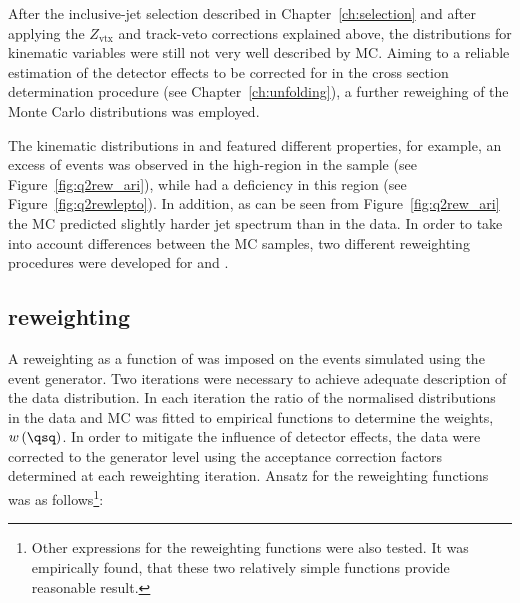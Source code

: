 After the inclusive-jet selection described in Chapter~\ref{ch:selection} and after applying the $Z_\text{vtx}$ and track-veto corrections explained above, the distributions for kinematic variables were still not very well described by MC. Aiming to a reliable estimation of the detector effects to be corrected for in the cross section determination procedure (see Chapter~\ref{ch:unfolding}), a further reweighing of the Monte Carlo distributions was employed. 

The kinematic distributions in \lepto and \ariadne featured different properties, for example, an excess of events was observed in the high-\qsq region in the \ariadne sample (see Figure~\ref{fig:q2rew_ari}), while \lepto had a deficiency in this region (see Figure~\ref{fig:q2rewlepto}). In addition, as can be seen from Figure~\ref{fig:q2rew_ari} the \ariadne MC predicted slightly harder jet spectrum than in the data. In order to take into account differences between the MC samples, two different reweighting procedures were developed for \lepto and \ariadne.

\subsection{\lepto reweighting}
\label{subsec:leptoq2rew}
A reweighting as a function of \qsq was imposed on the events simulated using the \lepto event generator. Two iterations were necessary to achieve adequate description of the data distribution. In each iteration the ratio of the normalised \qsq distributions in the data and MC was fitted to empirical functions to determine the weights, $w\left( \qsq\right) $. In order to mitigate the influence of detector effects, the data were corrected to the generator level using the acceptance correction factors determined at each reweighting iteration. Ansatz for the reweighting functions was as follows\footnote{Other expressions for the reweighting functions were also tested. It was empirically found, that these two relatively simple functions provide reasonable result.}:

